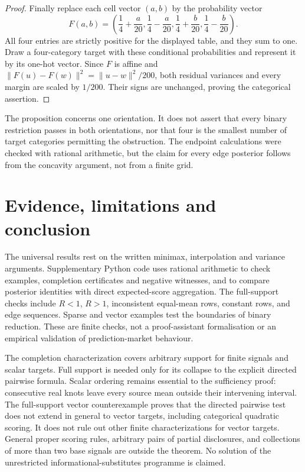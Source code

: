\documentclass[11pt,a4paper]{article}
\begin{document}
\begin{proof}
Finally replace each cell vector $(a,b)$ by the probability vector
\[
 F(a,b)=\left(\frac14+\frac a{20},\frac14-\frac a{20},
                 \frac14+\frac b{20},\frac14-\frac b{20}\right).
\]
All four entries are strictly positive for the displayed table, and they
sum to one. Draw a four-category target with these conditional
probabilities and represent it by its one-hot vector. Since $F$ is affine
and $\|F(u)-F(w)\|^2=\|u-w\|^2/200$, both residual variances and every
margin are scaled by $1/200$. Their signs are unchanged, proving the
categorical assertion.
\end{proof}

The proposition concerns one orientation. It does not assert that every
binary restriction passes in both orientations, nor that four is the
smallest number of target categories permitting the obstruction. The
endpoint calculations were checked with rational arithmetic, but the
claim for every edge posterior follows from the concavity argument, not
from a finite grid.

\section{Evidence, limitations and conclusion}
The universal results rest on the written minimax, interpolation and variance arguments. Supplementary Python code uses rational arithmetic to check examples, completion certificates and negative witnesses, and to compare posterior identities with direct expected-score aggregation. The full-support checks include $R<1$, $R>1$, inconsistent equal-mean rows, constant rows, and edge sequences. Sparse and vector examples test the boundaries of binary reduction. These are finite checks, not a proof-assistant formalisation or an empirical validation of prediction-market behaviour.

The completion characterization covers arbitrary support for finite signals and scalar targets. Full support is needed only for its collapse to the explicit directed pairwise formula. Scalar ordering remains essential to the sufficiency proof: consecutive real knots leave every source mean outside their intervening interval. The full-support vector counterexample proves that the directed pairwise test does not extend in general to vector targets, including categorical quadratic scoring. It does not rule out other finite characterizations for vector targets. General proper scoring rules, arbitrary pairs of partial disclosures, and collections of more than two base signals are outside the theorem. No solution of the unrestricted informational-substitutes programme is claimed.
\end{document}
